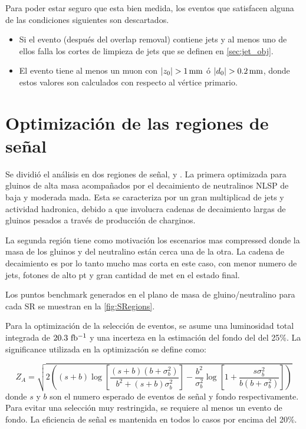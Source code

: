 Para poder estar seguro que {\met} esta bien medida, los eventos que satisfacen
alguna de las condiciones siguientes son descartados.
\begin{itemize}\itemsep0.1cm
\item Si el evento (después del overlap removal) contiene jets y al menos uno de ellos
  falla los cortes de limpieza de jets que se definen en \cref{sec:jet_obj}.
\item El evento tiene al menos un muon con  $|z_{0}| >   \unit[1]{mm}$ ó
  $|d_0| > \unit[0.2]{mm}$, donde estos valores son calculados con respecto al vértice
  primario.
\end{itemize}


\section{Optimización de las regiones de se\~nal}

Se dividió el análisis en dos regiones de señal, {\SRL} y {\SRH}.
La primera optimizada para gluinos de alta masa acompañados por el decaimiento de
neutralinos NLSP de baja y moderada mada. Esta se caracteriza por un gran multiplicad
de jets y actividad hadronica, debido a que involucra cadenas de decaimiento largas de gluinos
pesados a través de producción de charginos.

La segunda región tiene como motivación los escenarios mas compressed donde la masa de los gluinos
y del neutralino están cerca una de la otra. La cadena de decaimiento es por lo tanto mucho mas corta
en este caso, con menor numero de jets, fotones de alto pt y gran cantidad de met en el estado final.

Los puntos benchmark generados en el plano de masa de gluino/neutralino para cada SR se muestran en la
\cref{fig:SRegions}.

Para la optimización de la selección de eventos, se asume una luminosidad total integrada de
$20.3~\mbox{fb$^{-1}$}$ y una incerteza en la estimación del fondo del {\SM} del 25\%. La significance
utilizada en la optimización se define como:

\begin{equation*}
  Z_A = \sqrt{2 \left( (s + b) \log\left[\frac{(s + b) (b + \sigma_b^2)}{b^2 + (s + b) \sigma_b^2}\right] - \frac{b^2}{\sigma_b^2} \log\left[1 + \frac{s \sigma_b^2}{b (b + \sigma_b^2)}\right] \right)}
\end{equation*}
%
donde $s$ y $b$ son el numero esperado de eventos de señal y fondo respectivamente. Para evitar
una selección muy restringida, se requiere al menos un evento de fondo. La eficiencia de señal
es mantenida en todos lo casos por encima del 20\%.

